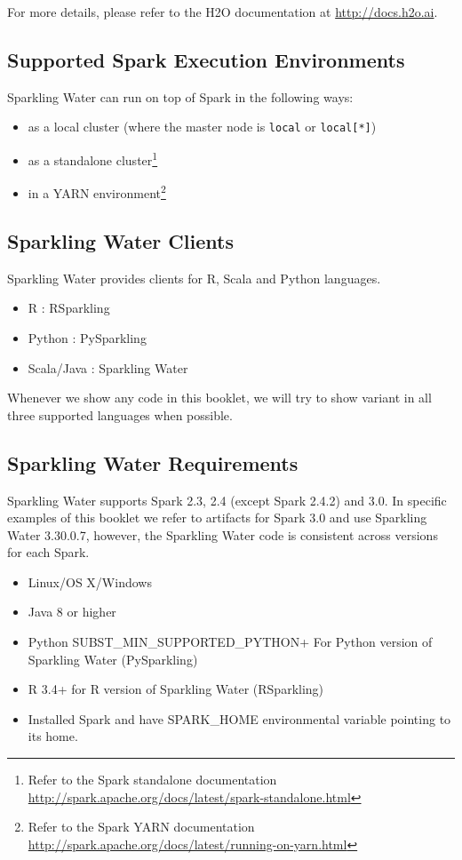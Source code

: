 \documentclass{standalone}
\begin{document}
    For more details, please refer to the H2O documentation at {\url{http://docs.h2o.ai}}.

    \subsection{Supported Spark Execution Environments}

    Sparkling Water can run on top of Spark in the following ways:
    \begin{itemize}
        \item as a local cluster (where the master node is \texttt{local} or \texttt{local[*]})
        \item as a standalone cluster\footnote{Refer to the Spark standalone documentation
        \url{http://spark.apache.org/docs/latest/spark-standalone.html}}
        \item in a YARN environment\footnote{Refer to the Spark YARN documentation \url{http://spark.apache.org/docs/latest/running-on-yarn.html}}
    \end{itemize}

    \subsection{Sparkling Water Clients}

    Sparkling Water provides clients for R, Scala and Python languages.

    \begin{itemize}
        \item R : RSparkling
        \item Python : PySparkling
        \item Scala/Java : Sparkling Water
    \end{itemize}

    Whenever we show any code in this booklet, we will try to show variant in all three supported languages when possible.

    \subsection{Sparkling Water Requirements}

    Sparkling Water supports Spark 2.3, 2.4 (except Spark 2.4.2) and 3.0. In specific examples of this
    booklet we refer to artifacts for Spark 3.0 and use Sparkling Water 3.30.0.7, however, the Sparkling Water code is
    consistent across versions for each Spark.

    \begin{itemize}
        \item Linux/OS X/Windows
        \item Java 8 or higher
        \item Python SUBST_MIN_SUPPORTED_PYTHON+ For Python version of Sparkling Water (PySparkling)
        \item R 3.4+ for R version of Sparkling Water (RSparkling)
        \item Installed Spark and have SPARK\_HOME environmental variable pointing to its home.
    \end{itemize}
\end{document}
